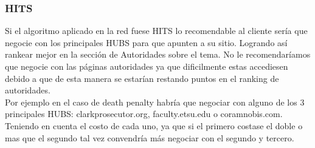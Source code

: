 
\subsubsection{HITS}
Si el algoritmo aplicado en la red fuese HITS lo recomendable al cliente sería que negocie con los principales HUBS para que apunten a su sitio. Logrando así rankear mejor en la sección de Autoridades sobre el tema. 
No le recomendaríamos que negocie con las páginas autoridades ya que dificilmente estas accediesen debido a que de esta manera se estarían restando puntos en el ranking de autoridades.\\
Por ejemplo en el caso de death penalty habría que negociar con alguno de los 3 principales HUBS: clarkprosecutor.org, faculty.etsu.edu o coramnobis.com. Teniendo en cuenta el costo de cada uno, ya que si el primero costase el doble 
o mas que el segundo tal vez convendría más negociar con el segundo y tercero.
